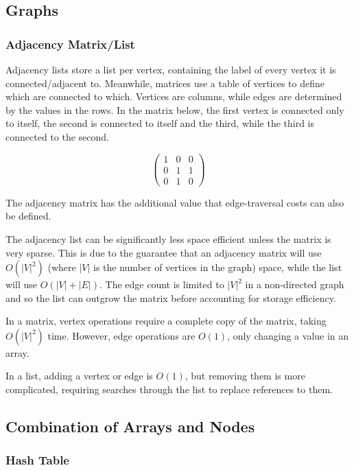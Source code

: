 \documentclass[]{article}
\begin{document}
\pagebreak

\subsection{Graphs}

\subsubsection{Adjacency Matrix/List}

Adjacency lists store a list per vertex, containing the label of every vertex it is connected/adjacent to. Meanwhile, matrices use a table of vertices to define which are connected to which. Vertices are columns, while edges are determined by the values in the rows. In the matrix below, the first vertex is connected only to itself, the second is connected to itself and the third, while the third is connected to the second.

\[ \left( \begin{array}{ccc}
1 & 0 & 0 \\
0 & 1 & 1 \\
0 & 1 & 0 \end{array} \right)\] 

The adjacency matrix has the additional value that edge-traversal costs can also be defined.

The adjacency list can be significantly less space efficient unless the matrix is very sparse. This is due to the guarantee that an adjacency matrix will use $O(|V|^{2})$ (where $|V|$ is the number of vertices in the graph) space, while the list will use $O(|V| + |E|)$. The edge count is limited to $|V|^{2}$ in a non-directed graph and so the list can outgrow the matrix before accounting for storage efficiency.

In a matrix, vertex operations require a complete copy of the matrix, taking $O(|V|^{2})$ time. However, edge operations are $O(1)$, only changing a value in an array.

In a list, adding a vertex or edge is $O(1)$, but removing them is more complicated, requiring searches through the list to replace references to them.

\pagebreak

\subsection{Combination of Arrays and Nodes}

\subsubsection{Hash Table}
\end{document}
